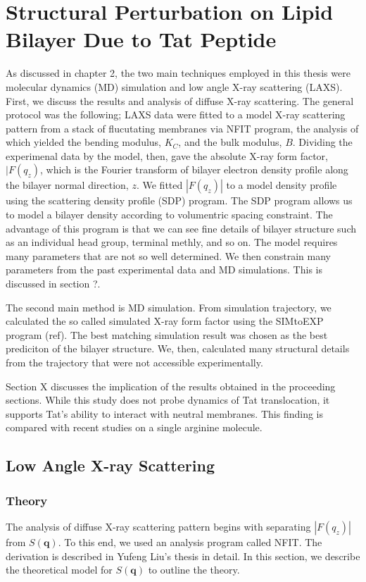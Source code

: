 \chapter{Structural Perturbation on Lipid Bilayer Due to Tat Peptide}
As discussed in chapter 2, the two main techniques employed in this thesis 
were molecular dynamics (MD) simulation and low angle X-ray scattering (LAXS).
First, we discuss the results and analysis of diffuse X-ray scattering. The
general protocol was the following; LAXS data were fitted to a model X-ray
scattering pattern from a stack of flucutating membranes via NFIT program,
the analysis of which yielded the bending modulus, $K_C$, and the bulk
modulus, $B$. Dividing the experimenal data by the model, then, gave the 
absolute X-ray form factor, $|F(q_z)$, which is the Fourier transform
of bilayer electron density profile along the bilayer normal direction, $z$. 
We fitted $|F(q_z)|$ to a model density profile using the scattering density
profile (SDP) program. The SDP program allows us to model a bilayer density
according to volumentric spacing constraint. The advantage of this program is
that we can see fine details of bilayer structure such as an individual
head group, terminal methly, and so on. The model requires many parameters
that are not so well determined. We then constrain many parameters from
the past experimental data and MD simulations. This is discussed in 
section ?.

The second main method is MD simulation. From simulation trajectory, we 
calculated the so called simulated X-ray form factor using the SIMtoEXP
program (ref). The best matching simulation result was chosen as the best
prediciton of the bilayer structure. We, then, calculated many structural
details from the trajectory that were not accessible experimentally.   

Section X discusses the implication of the results obtained in the proceeding 
sections. While this study does not probe dynamics of Tat translocation,
it supports Tat's ability to interact with neutral membranes. This finding
is compared with recent studies on a single arginine molecule.
 
\section{Low Angle X-ray Scattering}
\subsection{Theory}
The analysis of diffuse X-ray scattering pattern begins with separating 
$|F(q_z)|$ from $S(\mathbf{q})$. To this end, we used an analysis program
called NFIT. The derivation is described in Yufeng Liu's thesis in detail. 
In this section, we describe the theoretical model for $S(\mathbf{q})$ to 
outline the theory. 

